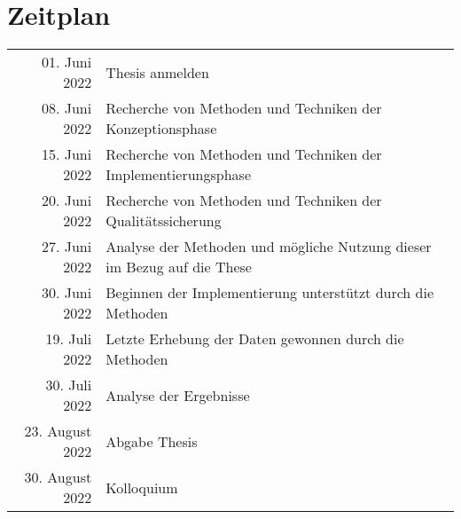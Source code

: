 \section*{Zeitplan}

\begingroup
\def\arraystretch{2}
\setlength\tabcolsep{20pt}
\begin{tabular}{ rl }
01. Juni 2022 & Thesis anmelden \\
08. Juni 2022 & Recherche von Methoden und Techniken der Konzeptionsphase \\
15. Juni 2022 & Recherche von Methoden und Techniken der Implementierungsphase \\
20. Juni 2022 & Recherche von Methoden und Techniken der Qualitätssicherung \\ 
27. Juni 2022 & Analyse der Methoden und mögliche Nutzung dieser im Bezug auf die These \\
30. Juni 2022 & Beginnen der Implementierung unterstützt durch die Methoden \\
19. Juli 2022 & Letzte Erhebung der Daten gewonnen durch die Methoden \\
30. Juli 2022 & Analyse der Ergebnisse \\
23. August 2022 & Abgabe Thesis \\
30. August 2022 & Kolloquium \\
\end{tabular}
\endgroup